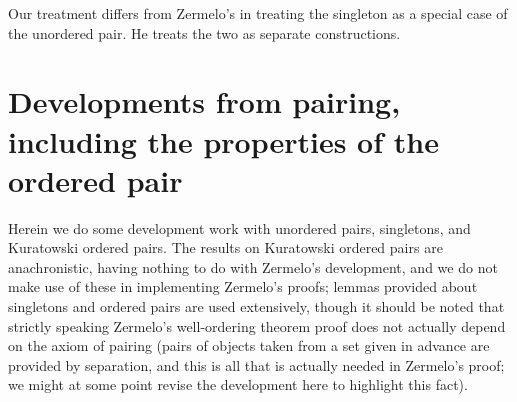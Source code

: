 \documentclass[12pt]{article}
\begin{document}
Our treatment differs from Zermelo's in treating the singleton as a special case of the unordered pair.  He treats the two as separate constructions.

\section{Developments from pairing, including the properties of the ordered pair}

Herein we do some development work with unordered pairs, singletons, and Kuratowski ordered pairs.  The results on Kuratowski ordered pairs are anachronistic, having nothing to do with Zermelo's development, and we do not make use  of these in implementing Zermelo's proofs;  lemmas provided about singletons and ordered pairs are used extensively, though it should be noted that strictly speaking Zermelo's well-ordering theorem proof does not actually depend on the axiom of pairing (pairs of objects taken from a set given in advance are provided by separation, and this is all that is actually needed in Zermelo's proof;  we might at some point revise the development here to highlight this fact).
\end{document}
